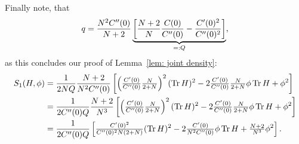 Finally note, that
\[
	q = \frac{N^2C''(0)}{N+2}
	\underbrace{
	\left[
		\frac{N +2}{N}\frac{C(0)}{C''(0)} - \frac{C'(0)^2}{C''(0)^2}
	\right]
	}_{=:Q},
\]
as this concludes our proof of Lemma~\ref{lem: joint density}:
\begin{align*}
	S_1(H, \phi)
	&= \frac1{2N Q}\frac{N+2}{N^2C''(0)}
	\left[
		\left(\tfrac{C'(0)}{C''(0)}\tfrac{N}{2+N}\right)^2(\operatorname{Tr} H)^2
		- 2\tfrac{C'(0)}{C''(0)}\tfrac{N}{2+N}\phi \operatorname{Tr} H
		+ \phi^2
	\right]\\
	&= \frac1{2C''(0)Q}\frac{N+2}{N^3}
	\left[
		\left(\tfrac{C'(0)}{C''(0)}\tfrac{N}{2+N}\right)^2(\operatorname{Tr} H)^2
		- 2\tfrac{C'(0)}{C''(0)}\tfrac{N}{2+N} \phi\operatorname{Tr} H
		+ \phi^2
	\right]\\
	&= \frac1{2C''(0)Q}
	\left[
		\tfrac{C'(0)^2}{C''(0)^2N(2+N)}(\operatorname{Tr} H)^2
		- 2\tfrac{C'(0)}{N^2C''(0)}\phi\operatorname{Tr} H
		+ \tfrac{N+2}{N^3}\phi^2
	\right].
\end{align*}